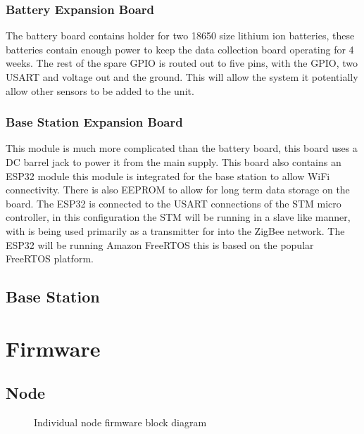 \documentclass{article}
\begin{document}
\subsubsection{Battery Expansion Board}
The battery board contains holder for two 18650 size lithium ion batteries, these batteries
contain enough power to keep the data collection board operating for 4 weeks. The rest of the
spare GPIO is routed out to five pins, with the GPIO, two USART and voltage out and the ground.
This will allow the system it potentially allow other sensors to be added to the unit.

\subsubsection{Base Station Expansion Board}
This module is much more complicated than the battery board, this board uses a DC barrel jack to
power it from the main supply. This board also contains an ESP32 module this module is integrated
for the base station to allow WiFi connectivity. There is also EEPROM to allow for long term data
storage on the board. The ESP32 is connected to the USART connections of the STM micro 
controller, in this configuration the STM will be running in a slave like manner, with is being 
used primarily as a transmitter for into the ZigBee network. The ESP32 will be running Amazon 
FreeRTOS this is based on the popular FreeRTOS platform.

\subsection{Base Station}

\section{Firmware}

\subsection{Node}

\begin{figure}[H]
    \centering
    \caption{Individual node firmware block diagram}
\end{figure}
\end{document}
